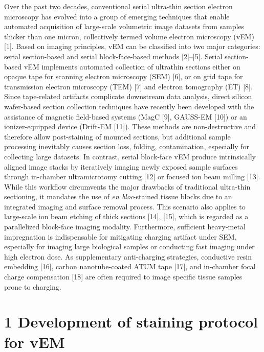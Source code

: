 \documentclass{article}
\begin{document}
\bigskip
\noindent Over the past two decades, conventional serial ultra-thin section electron microscopy has evolved into a group of emerging techniques that enable automated acquisition of large-scale volumetric image datasets from samples thicker than one micron, collectively termed volume electron microscopy (vEM) [1]. Based on imaging principles, vEM can be classified into two major categories: serial section-based and serial block-face-based methods [2]–[5]. Serial section-based vEM implements automated collection of ultrathin sections either on opaque tape for scanning electron microscopy (SEM) [6], or on grid tape for transmission electron microscopy (TEM) [7] and electron tomography (ET) [8]. Since tape-related artifacts complicate downstream data analysis, direct silicon wafer-based section collection techniques have recently been developed with the assistance of magnetic field-based systems (MagC [9], GAUSS-EM [10]) or an ionizer-equipped device (Drift-EM [11]). These methods are non-destructive and therefore allow post-staining of mounted sections, but additional sample processing inevitably causes section loss, folding, contamination, especially for collecting large datasets. In contrast, serial block-face vEM produce intrinsically aligned image stacks by iteratively imaging newly exposed sample surfaces through in-chamber ultramicrotomy cutting [12] or focused ion beam milling [13]. While this workflow circumvents the major drawbacks of traditional ultra-thin sectioning, it mandates the use of \emph{en bloc}-stained tissue blocks due to an integrated imaging and surface removal process. This scenario also applies to large-scale ion beam etching of thick sections [14], [15], which is regarded as a parallelized block-face imaging modality. Furthermore, sufficient heavy-metal impregnation is indispensable for mitigating charging artifact under SEM, especially for imaging large biological samples or conducting fast imaging under high electron dose. As supplementary anti-charging strategies, conductive resin embedding [16], carbon nanotube-coated ATUM tape [17], and in-chamber focal charge compensation [18] are often required to image specific tissue samples prone to charging.

\section*{1 Development of staining protocol for vEM}
\end{document}
